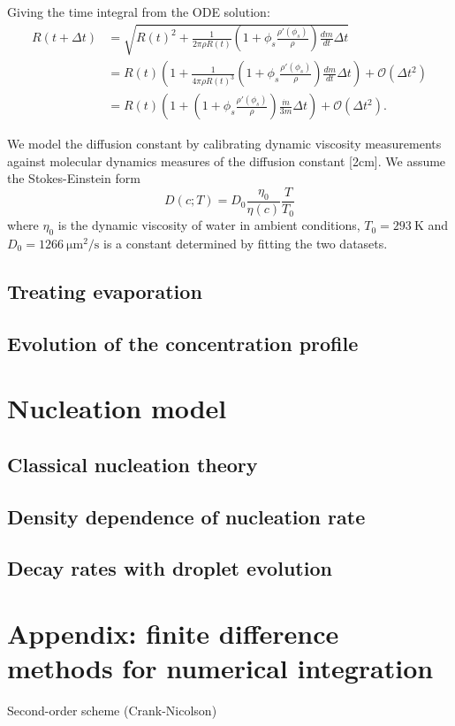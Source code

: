 \documentclass[12pt]{report}
\begin{document}
Giving the time integral from the ODE solution:
\begin{equation}
  \begin{aligned}
    R(t + \Delta t)
    &= \sqrt{R(t)^2 + \frac{1}{2\pi \rho R(t)}
      \left(
      1 + \phi_s \frac{\rho'(\phi_s)}{\rho}
      \right)
      \frac{dm}{dt} \Delta t} \\
    &= R(t) \left(
    1 + \frac{1}{4\pi \rho R(t)^3}
    \left(
    1 + \phi_s \frac{\rho'(\phi_s)}{\rho}
    \right)
    \frac{dm}{dt} \Delta t
    \right)
    + \mathcal{O}(\Delta t^2) \\
    &= R(t) \left(
    1 +
    \left(
    1 + \phi_s \frac{\rho'(\phi_s)}{\rho}
    \right)
    \frac{\dot{m}}{3m} \Delta t
    \right)
    + \mathcal{O}(\Delta t^2).
  \end{aligned}
\end{equation}

We model the diffusion constant by calibrating dynamic viscosity measurements
 against molecular dynamics measures of the diffusion constant [2cm].
We assume the Stokes-Einstein form
\begin{equation}
  D(c;T) = D_0 \frac{\eta_0}{\eta(c)} \frac{T}{T_0}
\end{equation}
where $\eta_0$ is the dynamic viscosity of water in ambient conditions, $T_0 = \SI{293}{\kelvin}$ and $D_0 = \SI{1266}{\micro\metre^2\per\second}$ is a constant determined by fitting the two datasets.

\subsection{Treating evaporation}
\subsection{Evolution of the concentration profile}

\section{Nucleation model}
\subsection{Classical nucleation theory}
\subsection{Density dependence of nucleation rate}
\subsection{Decay rates with droplet evolution}

\section{Appendix: finite difference methods for numerical integration}
Second-order scheme (Crank-Nicolson)
\end{document}
